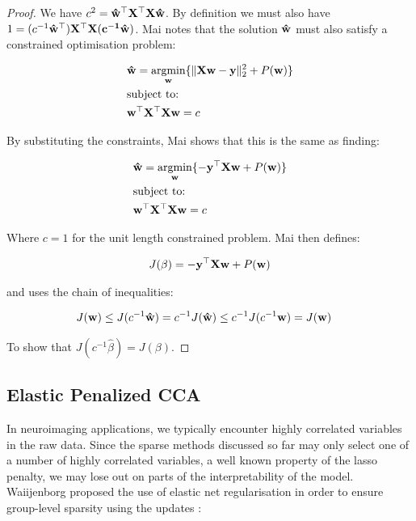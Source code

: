 \begin{proof}

    We have $c^2=\bold{\hat{w}^{\top}X^{\top}X\hat{w}}$. By definition we must also have $1=(c^{-1}\bold{\hat{w}^{\top})X^{\top}X(c^{-1}\hat{w})}$. Mai notes that the solution $\bold{\hat{w}}$ must also satisfy a constrained optimisation problem:

    \begin{align}
        & \bold{\hat{w}}= \underset{\bold{w}}{\mathrm{argmin}}\{ \|\bold{Xw-y}\|^2_2 + P(\bold{w}) \}\\
        & \text{subject to:} \notag\\
        & \bold{w^{\top}X^{\top}Xw}=c \notag
    \end{align}

    By substituting the constraints, Mai shows that this is the same as finding:

    \begin{align}
        & \bold{\hat{w}}=\underset{\bold{w}}{\mathrm{argmin}}\{ -\bold{y^{\top}Xw} + P(\bold{w)} \}\\
        & \text{subject to:} \notag\\
        & \bold{w^{\top}X^{\top}Xw}=c \notag
    \end{align}

    Where $c=1$ for the unit length constrained problem. Mai then defines:

    \begin{align}
        & J(\beta)=-\bold{y^{\top}Xw} + P(\bold{w})\\
    \end{align}

    and uses the chain of inequalities:

    \begin{align}
        \label{eq:maiinequalitychain}
        & J(\bold{w}) \leq J(c^{-1}\bold{\hat{w}})=c^{-1}J(\bold{\hat{w}}) \leq c^{-1}J(c^{-1}\bold{w}) = J(\bold{w})
    \end{align}

    To show that $J(c^{-1}\hat{\beta})=J(\beta)$.

\end{proof}

\subsection{Elastic Penalized CCA}

In neuroimaging applications, we typically encounter highly correlated variables in the raw data. Since the sparse methods discussed so far may only select one of a number of highly correlated variables, a well known property of the lasso penalty, we may lose out on parts of the interpretability of the model. Waiijenborg proposed the use of elastic net regularisation in order to ensure group-level sparsity using the updates \cite{waaijenborg2008quantifying}:

